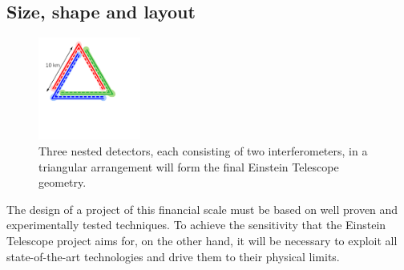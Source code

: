 \subsection{Size, shape and layout}
\begin{figure}
\vspace{-0.1cm}
	\centering
		\includegraphics[width=0.3\textwidth]{Intro/Intro_Figures/ET_simpleB.pdf}
	\caption{Three nested detectors, each consisting of two interferometers, in a triangular arrangement will form the final Einstein Telescope geometry.}
	\label{fig:NestedDetectorsA}
	\vspace{-0.5cm}
\end{figure}
The design of a project of this financial scale 
must be based on well proven and experimentally tested techniques. To achieve the sensitivity that the Einstein Telescope project aims for, on the other hand, it will be necessary to exploit all state-of-the-art technologies and drive them to their physical limits.

